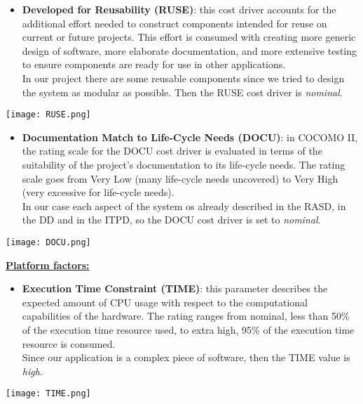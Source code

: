 \begin{itemize}
	\item \textbf{Developed for Reusability (RUSE)}: this cost driver accounts for the additional effort needed to construct components intended for reuse on current or future projects. This effort is consumed with creating more generic design of software, more elaborate documentation, and more extensive testing to ensure components are ready for use in other applications. \\ In our project there are some reusable components since we tried to design the system as modular as possible. Then the RUSE cost driver is \textit{nominal}.
\end{itemize}
\begin{center}
	\texttt{[image: RUSE.png]}
\end{center}

\begin{itemize}
	\item \textbf{Documentation Match to Life-Cycle Needs (DOCU)}: in COCOMO II, the rating scale for the DOCU cost driver is evaluated in terms of the suitability of the project’s documentation to its life-cycle needs. The rating scale goes from Very Low (many life-cycle needs uncovered) to Very High (very excessive for life-cycle needs). \\ In our case each aspect of the system os already described in the RASD, in the DD and in the ITPD, so the DOCU cost driver is set to \textit{nominal}.
\end{itemize}
\begin{center}
	\texttt{[image: DOCU.png]}
\end{center}
\textbf{\underline{Platform factors:}}

\begin{itemize}
	\item \textbf{Execution Time Constraint (TIME)}: this parameter describes the expected amount of CPU usage with respect to the computational capabilities of the hardware. The rating ranges from	nominal, less than 50\% of the execution time resource used, to extra high, 95\% of the execution time resource is consumed. \\Since our application is a complex piece of software, then the TIME value is \textit{high}.
\end{itemize}
\begin{center}
	\texttt{[image: TIME.png]}
\end{center}	

